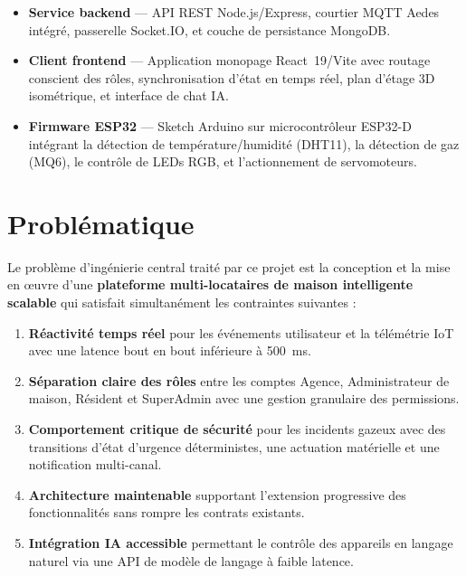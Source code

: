 \begin{itemize}[leftmargin=1.5cm,itemsep=6pt]
  \item \textbf{Service backend} --- API REST Node.js/Express, courtier MQTT Aedes intégré,
        passerelle Socket.IO, et couche de persistance MongoDB.
  \item \textbf{Client frontend} --- Application monopage React~19/Vite avec routage
        conscient des rôles, synchronisation d'état en temps réel, plan d'étage 3D
        isométrique, et interface de chat IA.
  \item \textbf{Firmware ESP32} --- Sketch Arduino sur microcontrôleur ESP32-D intégrant
        la détection de température/humidité (DHT11), la détection de gaz (MQ6), le
        contrôle de LEDs RGB, et l'actionnement de servomoteurs.
\end{itemize}

\section{Problématique}

Le problème d'ingénierie central traité par ce projet est la conception et la mise en
œuvre d'une \textbf{plateforme multi-locataires de maison intelligente scalable} qui
satisfait simultanément les contraintes suivantes :

\begin{enumerate}[leftmargin=1.5cm,itemsep=6pt]
  \item \textbf{Réactivité temps réel} pour les événements utilisateur et la télémétrie
        IoT avec une latence bout en bout inférieure à 500~ms.
  \item \textbf{Séparation claire des rôles} entre les comptes Agence, Administrateur
        de maison, Résident et SuperAdmin avec une gestion granulaire des permissions.
  \item \textbf{Comportement critique de sécurité} pour les incidents gazeux avec des
        transitions d'état d'urgence déterministes, une actuation matérielle et une
        notification multi-canal.
  \item \textbf{Architecture maintenable} supportant l'extension progressive des
        fonctionnalités sans rompre les contrats existants.
  \item \textbf{Intégration IA accessible} permettant le contrôle des appareils en
        langage naturel via une API de modèle de langage à faible latence.
\end{enumerate}

